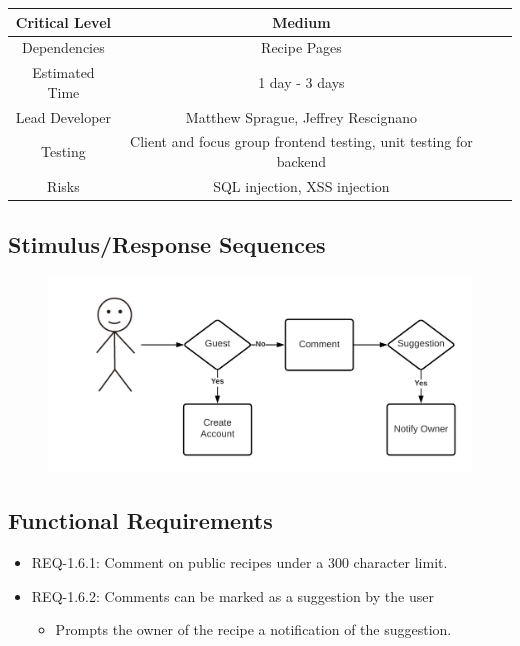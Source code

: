 \documentclass{scrreprt}
\begin{document}
\begin{center}
    \begin{tabular}{| c | c | c | c |}
        \hline
        Critical Level & Medium                                                            \\
        \hline
        Dependencies   & Recipe Pages                                                      \\
        \hline
        Estimated Time & 1 day - 3 days                                                    \\
        \hline
        Lead Developer & Matthew Sprague, Jeffrey Rescignano                               \\
        \hline
        Testing        & Client and focus group frontend testing, unit testing for backend \\
        \hline
        Risks          & \gls{SQL injection}, \gls{XSS injection}                          \\
        \hline
    \end{tabular}
\end{center}

\subsection{Stimulus/Response Sequences}

\begin{figure}[H]\centering
    \includegraphics[width=\columnwidth]{FlowCharts/Recipe-Commenting.png}
\end{figure}

\subsection{Functional Requirements}

\begin{itemize}
    \item REQ-1.6.1: Comment on public recipes under a 300 character limit.
    \item REQ-1.6.2: Comments can be marked as a suggestion by the user
          \begin{itemize}
              \item Prompts the owner of the recipe a notification of the suggestion.
          \end{itemize}
\end{itemize}
\end{document}
